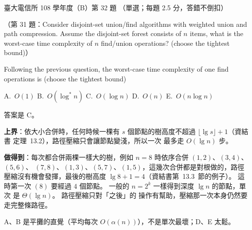 \begin{pastexam}[label={px:ntu-108-comm-dsab-32}]{臺大電信所 108 學年度（B）第 32 題}
（單選；每題 2.5 分，答錯不倒扣）

（第 31 題：Consider disjoint-set union/find algorithms with weighted union and path compression.
Assume the disjoint-set forest consists of $n$ items, what is the worst-case time complexity of
$n$ find/union operations? (choose the tightest bound)）

Following the previous question, the worst-case time complexity of one find operations is (choose
the tightest bound)

A.~$O(1)$ \qquad B.~$O(\log^* n)$ \qquad C.~$O(\log n)$ \qquad D.~$O(n)$ \qquad E.~$O(n\log n)$
\end{pastexam}

\begin{pastsoln}
答案是 C。

\textbf{上界}：依大小合併時，任何時候一棵有 $s$ 個節點的樹高度不超過 $\lfloor \lg s \rfloor + 1$（資結書
定理~13.2），路徑壓縮只會讓節點變淺，所以一次  最多走 $O(\lg n)$ 步。

\textbf{做得到}：每次都合併兩棵一樣大的樹，例如 $n = 8$ 時依序合併 $(1, 2)$、$(3, 4)$、$(5, 6)$、
$(7, 8)$、$(1, 3)$、$(5, 7)$、$(1, 5)$，這幾次合併都是對根做的，路徑壓縮沒有機會發揮，最後的樹高度
$\lg 8 + 1 = 4$（資結書第~13.3~節的例子）。 這時第一次 $(8)$ 要經過 $4$ 個節點。 一般的
$n = 2^k$ 一樣得到深度 $\lg n$ 的節點，單次  是 $\Theta(\lg n)$。 路徑壓縮只對「之後」的
操作有幫助，壓縮那一次本身仍然要走完整條路徑。

A、B 是平攤的直覺（平均每次 $O(\alpha(n))$），不是單次最壞；D、E 太鬆。
\end{pastsoln}
